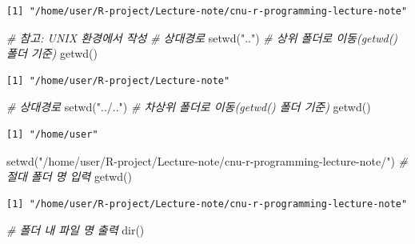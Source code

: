 \documentclass[
  11pt,
]{krantz}
\newenvironment{Shaded}{\begin{snugshade}}{\end{snugshade}}
\newcommand{\CommentTok}[1]{\textcolor[rgb]{0.37,0.37,0.37}{\textit{#1}}}
\newcommand{\FunctionTok}[1]{\textcolor[rgb]{0,0,0}{#1}}
\newcommand{\NormalTok}[1]{#1}
\newcommand{\StringTok}[1]{\textcolor[rgb]{0.5,0.5,0.5}{#1}}
\begin{document}
\begin{verbatim}
[1] "/home/user/R-project/Lecture-note/cnu-r-programming-lecture-note"
\end{verbatim}

\normalsize

\footnotesize

\begin{Shaded}
\begin{Highlighting}[]
\CommentTok{\# 참고: UNIX 환경에서 작성}
\CommentTok{\# 상대경로}
\FunctionTok{setwd}\NormalTok{(}\StringTok{".."}\NormalTok{) }\CommentTok{\# 상위 폴더로 이동(getwd() 폴더 기준)}
\FunctionTok{getwd}\NormalTok{()}
\end{Highlighting}
\end{Shaded}

\begin{verbatim}
[1] "/home/user/R-project/Lecture-note"
\end{verbatim}

\begin{Shaded}
\begin{Highlighting}[]
\CommentTok{\# 상대경로}
\FunctionTok{setwd}\NormalTok{(}\StringTok{"../.."}\NormalTok{) }\CommentTok{\# 차상위 폴더로 이동(getwd() 폴더 기준)}
\FunctionTok{getwd}\NormalTok{()}
\end{Highlighting}
\end{Shaded}

\begin{verbatim}
[1] "/home/user"
\end{verbatim}

\begin{Shaded}
\begin{Highlighting}[]
\FunctionTok{setwd}\NormalTok{(}\StringTok{"/home/user/R{-}project/Lecture{-}note/cnu{-}r{-}programming{-}lecture{-}note/"}\NormalTok{) }\CommentTok{\# 절대 폴더 명 입력}
\FunctionTok{getwd}\NormalTok{()}
\end{Highlighting}
\end{Shaded}

\begin{verbatim}
[1] "/home/user/R-project/Lecture-note/cnu-r-programming-lecture-note"
\end{verbatim}

\begin{Shaded}
\begin{Highlighting}[]
\CommentTok{\# 폴더 내 파일 명 출력}
\FunctionTok{dir}\NormalTok{()}
\end{Highlighting}
\end{Shaded}
\end{document}
